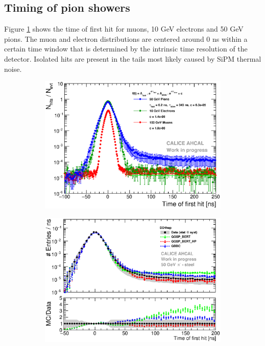 \documentclass{JINST}
\begin{document}
\subsection{Timing of pion showers}

Figure \ref{fig:dNdt_Data} shows the time of first hit for muons, 10 GeV electrons and 50 GeV pions. The muon and electron distributions are centered around 0 ns within a certain time window that is determined by the intrinsic time resolution of the detector. Isolated hits are present in the tails most likely caused by SiPM thermal noise.

\begin{figure}[htbp!]
  \centering
  \begin{subfigure}[t]{0.49\textwidth}
    \includegraphics[width=1\textwidth]{fig/Timing_dNdt_Comparison.eps}
    \caption{}\label{fig:dNdt_Data}
  \end{subfigure}
  \hfill
  \begin{subfigure}[t]{0.49\textwidth}
    \includegraphics[width=1\textwidth]{fig/Comparison_SimData_Pion50GeV_LateClusters_DD4hep_Ratio.eps}

\end{subfigure}
\end{figure}
\end{document}
